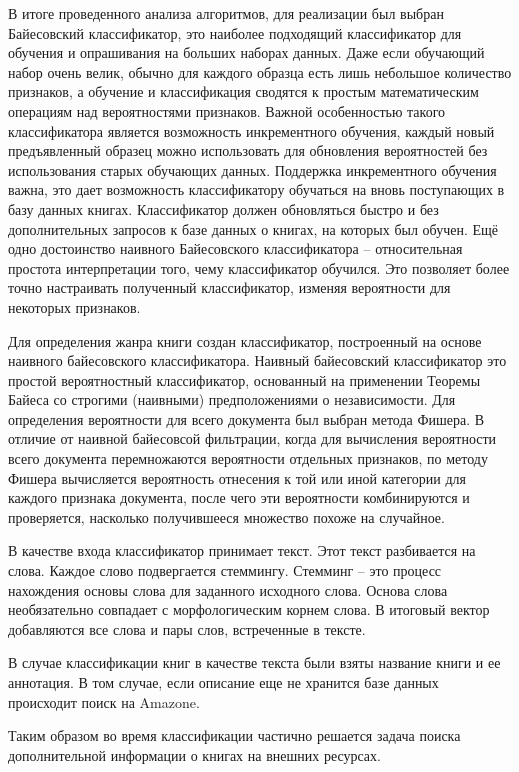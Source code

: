 \documentclass[a4paper]{report}
\begin{document}
В итоге проведенного анализа алгоритмов, для реализации был выбран Байесовский классификатор, \tk это наиболее подходящий классификатор для обучения и опрашивания на больших наборах данных. Даже если обучающий набор очень велик, обычно для каждого образца есть лишь небольшое количество признаков, а обучение и классификация сводятся к простым математическим операциям над вероятностями признаков. Важной особенностью такого классификатора является возможность инкрементного обучения, \te каждый новый предъявленный образец можно использовать для обновления вероятностей без использования старых обучающих данных. Поддержка инкрементного обучения важна, \tk это дает возможность классификатору обучаться на вновь поступающих в базу данных книгах. Классификатор должен обновляться быстро и без дополнительных запросов к базе данных о книгах, на которых был обучен. Ещё одно достоинство наивного Байесовского классификатора -- относительная простота интерпретации того, чему классификатор обучился. Это позволяет более точно настраивать полученный классификатор, изменяя вероятности для некоторых признаков.


 Для определения жанра книги создан классификатор, построенный на основе наивного байесовского классификатора. Наивный байесовский классификатор это простой вероятностный классификатор, основанный на применении Теоремы Байеса со строгими (наивными) предположениями о независимости. Для определения вероятности для всего документа был выбран метода Фишера. 
В отличие от наивной байесовсой фильтрации, когда для вычисления вероятности всего документа перемножаются вероятности отдельных признаков, по методу Фишера вычисляется вероятность отнесения к той или иной категории для каждого признака документа, после чего эти вероятности комбинируются и проверяется, насколько получившееся множество похоже на случайное.

В качестве входа классификатор принимает текст. Этот текст разбивается на слова. Каждое слово подвергается стеммингу. Стемминг -- это процесс нахождения основы слова для заданного исходного слова. Основа слова необязательно совпадает с морфологическим корнем слова. В итоговый вектор добавляются все слова и пары слов, встреченные в тексте.

В случае классификации книг в качестве текста были взяты название книги и ее аннотация. В том случае, если описание  еще не хранится базе данных происходит поиск на Amazone.

Таким образом во время классификации частично решается задача поиска дополнительной информации о книгах на внешних ресурсах.
\end{document}
